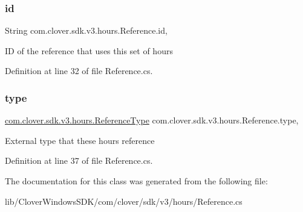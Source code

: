 \subsubsection{\texorpdfstring{id}{id}}
{\footnotesize\ttfamily String com.\+clover.\+sdk.\+v3.\+hours.\+Reference.\+id\hspace{0.3cm}{\ttfamily [get]}, {\ttfamily [set]}}



ID of the reference that uses this set of hours 



Definition at line 32 of file Reference.\+cs.

\mbox{\label{classcom_1_1clover_1_1sdk_1_1v3_1_1hours_1_1_reference_ad2681c4206e183b6b2415b93ca2278d7}} 
\subsubsection{\texorpdfstring{type}{type}}
{\footnotesize\ttfamily \hyperlink{namespacecom_1_1clover_1_1sdk_1_1v3_1_1hours_a8525667c21e8dadaefd0a149ff85b867}{com.\+clover.\+sdk.\+v3.\+hours.\+Reference\+Type} com.\+clover.\+sdk.\+v3.\+hours.\+Reference.\+type\hspace{0.3cm}{\ttfamily [get]}, {\ttfamily [set]}}



External type that these hours reference 



Definition at line 37 of file Reference.\+cs.



The documentation for this class was generated from the following file\+:\begin{DoxyCompactItemize}
\item 
lib/\+Clover\+Windows\+S\+D\+K/com/clover/sdk/v3/hours/Reference.\+cs\end{DoxyCompactItemize}
